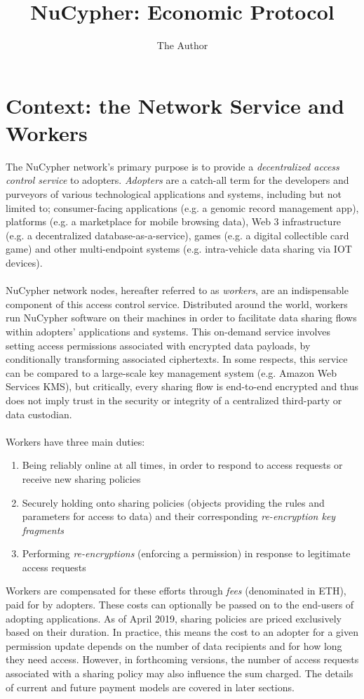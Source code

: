 \documentclass[11pt]{amsart}
\title{NuCypher: Economic Protocol}
\author{The Author}
\begin{document}
\pagecolor{magicmint!30}
\maketitle

\section{Context: the Network Service and Workers}\label{context}

The NuCypher network's primary purpose is to provide a {\it decentralized access control service} to adopters. \textit{Adopters} are a catch-all term for the developers and purveyors of various technological applications and systems, including but not limited to; consumer-facing applications (e.g. a genomic record management app), platforms (e.g. a marketplace for mobile browsing data), Web 3 infrastructure (e.g. a decentralized database-as-a-service), games (e.g. a digital collectible card game) and other multi-endpoint systems (e.g. intra-vehicle data sharing via IOT devices).
\\
\\
NuCypher network nodes, hereafter referred to as \textit{workers}, are an indispensable component of this access control service. Distributed around the world, workers run NuCypher software on their machines in order to facilitate data sharing flows within adopters' applications and systems. This on-demand service involves setting access permissions associated with encrypted data payloads, by conditionally transforming associated ciphertexts. In some respects, this service can be compared to a large-scale key management system (e.g. Amazon Web Services KMS), but critically, every sharing flow is end-to-end encrypted and thus does not imply trust in the security or integrity of a centralized third-party or data custodian. 
\\
\\
Workers have three main duties:
\begin{enumerate}
   \item Being reliably online at all times, in order to respond to access requests or receive new sharing policies
   \item Securely holding onto sharing policies (objects providing the rules and parameters for access to data) and their corresponding {\it re-encryption key fragments}
   \item Performing {\it re-encryptions} (enforcing a permission) in response to legitimate access requests
\end{enumerate}
Workers are compensated for these efforts through \textit{fees} (denominated in ETH), paid for by adopters. These costs can optionally be passed on to the end-users of adopting applications. As of April 2019, sharing policies are priced exclusively based on their duration. In practice, this means the cost to an adopter for a given permission update depends on the number of data recipients and for how long they need access. However, in forthcoming versions, the number of access requests associated with a sharing policy may also influence the sum charged. The details of current and future payment models are covered in later sections.
\end{document}
